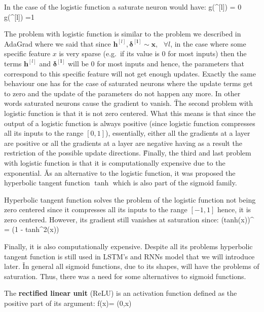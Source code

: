 In the case of the logistic function a saturate neuron would have:
\bse
g({}^{[l]}) = 0 \quad {} \quad g({}^{[l]}) =1
\ese

The problem with logistic function is similar to the problem we described in AdaGrad where we said that since 
${\boldsymbol{h}^{[l]}}, \boldsymbol{\delta^{[l]}} \sim \boldsymbol{x}, \:\:\: \forall l$, in the case where some 
specific feature $x$ is very sparse (e.g.\ if its value is 0 for most inputs) then the terms ${\boldsymbol{h}^{[l]}}$
and $\boldsymbol{\delta^{[l]}}$ will be 0 for most inputs and hence, the parameters that correspond to this specific
feature will not get enough updates. Exactly the same behaviour one has for the case of saturated neurons where the 
update terms get to zero and the update of the parameters do not happen any more. In other words saturated neurons 
cause the gradient to vanish. \v

The second problem with logistic function is that it is not zero centered. What this means is that since the output 
of a logistic function is always positive (since logistic function compresses all its inputs to the range $[0,1]$), 
essentially, either all the gradients at a layer are positive or all the gradients at a layer are negative having as 
a result the restriction of the possible update directions. \v

Finally, the third and last problem with logistic function is that it is computationally expensive due to the
exponential. \v

As an alternative to the logistic function, it was proposed the hyperbolic tangent function $\tanh$ which is also 
part of the sigmoid family.


Hyperbolic tangent function solves the problem of the logistic function not being zero centered since it compresses 
all its inputs to the range $[-1,1]$ hence, it is zero centered. However, its gradient still vanishes at saturation since:
\bse
(tanh(x))^{\prime} = (1 - tanh^{2}(x))
\ese

Finally, it is also computationally expensive. Despite all its problems hyperbolic tangent function is still used in
LSTM's and RNNs model that we will introduce later. \v

In general all sigmoid functions, due to its shapes, will have the problems of saturation. Thus, there was a need for
some alternatives to sigmoid functions.

The \textbf{rectified linear unit }(ReLU) is an activation function defined as the positive part of its argument:
\bse
f(x)= \max(0,x)
\ese

